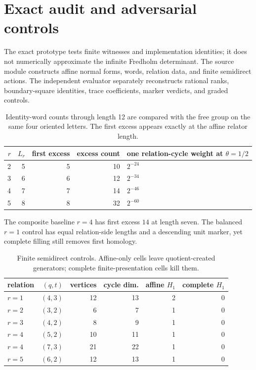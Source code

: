 \section{Exact audit and adversarial controls}
\label{sec:audit}

The exact prototype tests finite witnesses and implementation identities; it
does not numerically approximate the infinite Fredholm determinant.  The
source module constructs affine normal forms, words, relation data, and finite
semidirect actions.  The independent evaluator separately reconstructs
rational ranks, boundary-square identities, trace coefficients, marker
verdicts, and graded controls.

\begin{table}[H]
\centering
\small
\begin{tabularx}{\textwidth}{@{}r r r r Y@{}}
\toprule
$r$ & $L_r$ & first excess & excess count & one relation-cycle weight at
$\theta=1/2$ \\
 & 5 & 5 & 10 & $2^{-24}$ \\
3 & 6 & 6 & 12 & $2^{-34}$ \\
4 & 7 & 7 & 14 & $2^{-46}$ \\
5 & 8 & 8 & 32 & $2^{-60}$ \\
\bottomrule
\end{tabularx}
\caption{Identity-word counts through length 12 are compared with the free
group on the same four oriented letters.  The first excess appears exactly at
the affine relator length.}
\label{tab:word-audit}
\end{table}

The composite baseline $r=4$ has first excess $14$ at length seven.  The
balanced $r=1$ control has equal relation-side lengths and a descending unit
marker, yet complete filling still removes first homology.

\begin{table}[H]
\centering
\small
\begin{tabular}{@{}lrrrrr@{}}
\toprule
relation & $(q,t)$ & vertices & cycle dim. & affine $H_1$ & complete $H_1$ \\
\midrule
$r=1$ & $(4,3)$ & 12 & 13 & 2 & 0 \\
$r=2$ & $(3,2)$ & 6 & 7 & 1 & 0 \\
$r=3$ & $(4,2)$ & 8 & 9 & 1 & 0 \\
$r=4$ & $(5,2)$ & 10 & 11 & 1 & 0 \\
$r=4$ & $(7,3)$ & 21 & 22 & 1 & 0 \\
$r=5$ & $(6,2)$ & 12 & 13 & 1 & 0 \\
\bottomrule
\end{tabular}
\caption{Finite semidirect controls.  Affine-only cells leave quotient-created
generators; complete finite-presentation cells kill them.}
\label{tab:finite-audit}
\end{table}

